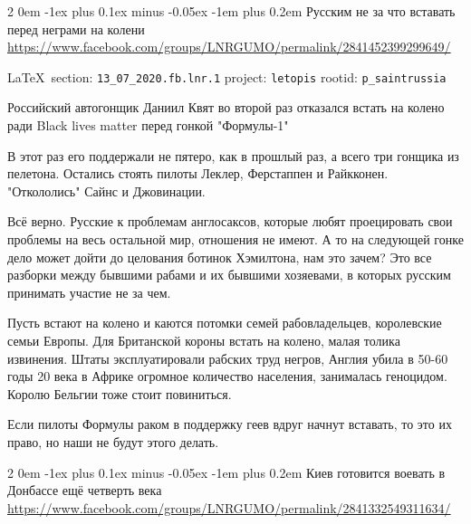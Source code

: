 \documentclass[a4paper,11pt]{extreport}
\makeatletter
\renewcommand\subsection{%
  \clearpage
    \@startsection{subsection}%
    {2}%
    {0em}%
    {-1ex plus 0.1ex minus -0.05ex}%
    {-1em plus 0.2em}%
    {\scshape\bfseries\Large}%
}
\makeatother
\begin{document}
 
 

\subsection{Русским не за что вставать перед неграми на колени}
\label{sec:13_07_2020.fb.lnr.1}
\url{https://www.facebook.com/groups/LNRGUMO/permalink/2841452399299649/}

\vspace{0.5cm}
{\ifDEBUG\small\LaTeX~section: \verb|13_07_2020.fb.lnr.1| project: \verb|letopis| rootid: \verb|p_saintrussia|\fi}
\vspace{0.5cm}

  
Российский автогонщик Даниил Квят во второй раз отказался встать на колено ради
Black lives matter перед гонкой "Формулы-1"

В этот раз его поддержали не пятеро, как в прошлый раз, а всего три гонщика из
пелетона. Остались стоять пилоты Леклер, Ферстаппен и Райкконен. "Откололись"
Сайнс и Джовинации.

Всё верно. Русские к проблемам англосаксов, которые любят проецировать свои
проблемы на весь остальной мир, отношения не имеют. А то на следующей гонке
дело может дойти до целования ботинок Хэмилтона, нам это зачем? Это все
разборки между бывшими рабами и их бывшими хозяевами, в которых русским
принимать участие не за чем.

Пусть встают на колено и каются потомки семей рабовладельцев, королевские семьи
Европы. Для Британской короны встать на колено, малая толика извинения. Штаты
эксплуатировали рабских труд негров, Англия убила в 50-60 годы 20 века в Африке
огромное количество населения, занималась геноцидом. Королю Бельгии тоже стоит
повиниться.

Если пилоты Формулы раком в поддержку геев вдруг начнут вставать, то это их
право, но наши не будут этого делать.
 
 

\subsection{Киев готовится воевать в Донбассе ещё четверть века}
\label{sec:13_07_2020.fb.lnr.2}
\url{https://www.facebook.com/groups/LNRGUMO/permalink/2841332549311634/}
  
\end{document}
